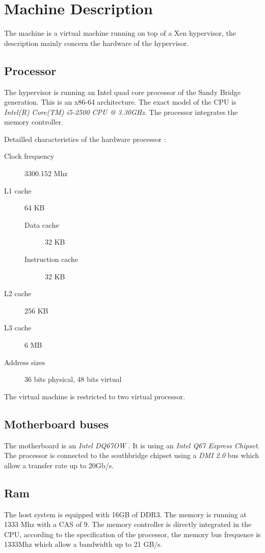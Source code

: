 \section{Machine Description}
The machine is a virtual machine running on top of a Xen hypervisor, the
description mainly concern the hardware of the hypervisor.

\subsection{Processor}
The hypervisor is running an Intel quad core processor of the Sandy Bridge generation.
This is an x86-64 architecture.
The exact model of the CPU is \emph{Intel(R) Core(TM) i5-2500 CPU @ 3.30GHz}. \cite{intel-i5-2500}
The processor integrates the memory controller.

Detailled characteristics of the hardware processor :
\begin{description}
\item[Clock frequency] 3300.152 Mhz
\item[L1 cache] 64 KB
\begin{description}
\item[Data cache] 32 KB
\item[Instruction cache] 32 KB
\end{description}
\item[L2 cache] 256 KB
\item[L3 cache] 6 MB
\item[Address sizes] 36 bits physical, 48 bits virtual
\end{description}
The virtual machine is restricted to two virtual processor.

\subsection{Motherboard buses}
The motherboard is an \emph{Intel DQ67OW} \cite{dq670w-motherboard}. It is using an \emph{Intel Q67
Express Chipset}. \cite{q67-chipset}
The processor is connected to the southbridge chipset using a \emph{DMI 2.0} bus which
allow a transfer rate up to 20Gb/s.

\subsection{Ram}
The host system is equipped with 16GB of DDR3.
The memory is running at 1333 Mhz with a CAS of 9.
The memory controller is directly integrated in the CPU, according to the
specification of the processor, the memory bus frequence is 1333Mhz which allow a bandwidth up
to 21 GB/s. \cite{intel-i5-2500}


